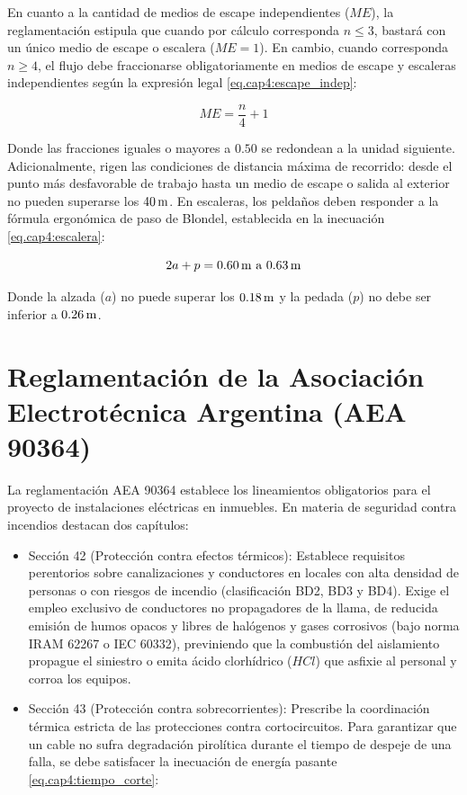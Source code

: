 En cuanto a la cantidad de medios de escape independientes ($ME$), la reglamentación estipula que cuando por cálculo corresponda
$n \le 3$, bastará con un único medio de escape o escalera ($ME = 1$). En cambio, cuando corresponda $n \ge 4$, el flujo debe
fraccionarse obligatoriamente en medios de escape y escaleras independientes según la expresión legal \ref{eq.cap4:escape_indep}:

\begin{equation}
\label{eq.cap4:escape_indep}
ME = \frac{n}{4} + 1
\end{equation}

Donde las fracciones iguales o mayores a $0.50$ se redondean a la unidad siguiente. Adicionalmente, rigen las condiciones de
distancia máxima de recorrido: desde el punto más desfavorable de trabajo hasta un medio de escape o salida al exterior no
pueden superarse los $40\,\mathrm{m}$. En escaleras, los peldaños deben responder a la fórmula ergonómica de paso de Blondel,
establecida en la inecuación \ref{eq.cap4:escalera}:

\begin{equation}
\label{eq.cap4:escalera}
2a + p = 0.60\,\mathrm{m} \text{ a } 0.63\,\mathrm{m}
\end{equation}

Donde la alzada ($a$) no puede superar los $0.18\,\mathrm{m}$ y la pedada ($p$) no debe ser inferior a $0.26\,\mathrm{m}$.

\section{Reglamentación de la Asociación Electrotécnica Argentina (AEA 90364)}

La reglamentación AEA 90364 establece los lineamientos obligatorios para el proyecto de instalaciones eléctricas en
inmuebles. En materia de seguridad contra incendios destacan dos capítulos:

\begin{itemize}
    \item Sección 42 (Protección contra efectos térmicos): Establece requisitos perentorios sobre canalizaciones y
          conductores en locales con alta densidad de personas o con riesgos de incendio (clasificación BD2, BD3 y BD4).
          Exige el empleo exclusivo de conductores no propagadores de la llama, de reducida emisión de humos opacos y
          libres de halógenos y gases corrosivos (bajo norma IRAM 62267 o IEC 60332), previniendo que la combustión del
          aislamiento propague el siniestro o emita ácido clorhídrico ($HCl$) que asfixie al personal y corroa los
          equipos.
    \item Sección 43 (Protección contra sobrecorrientes): Prescribe la coordinación térmica estricta de las protecciones
          contra cortocircuitos. Para garantizar que un cable no sufra degradación pirolítica durante el tiempo de
          despeje de una falla, se debe satisfacer la inecuación de energía pasante \ref{eq.cap4:tiempo_corte}:
\end{itemize}

